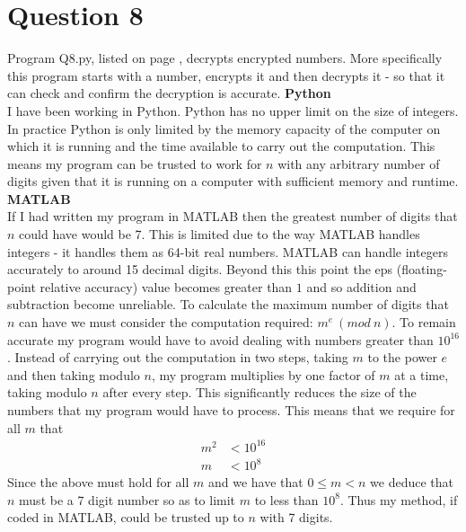 \documentclass[a4paper]{article}
\begin{document}
\section*{Question 8}
Program Q8.py, listed on page \pageref{PQ8}, decrypts encrypted numbers. More specifically this program starts with a number, encrypts it and then decrypts it - so that it can check and confirm the decryption is accurate.
\bigbreak
\textbf{Python} \\
I have been working in Python. Python has no upper limit on the size of integers. In practice Python is only limited by the memory capacity of the computer on which it is running and the time available to carry out the computation. This means my program can be trusted to work for $n$ with any arbitrary number of digits given that it is running on a computer with sufficient memory and runtime.
\bigbreak
\textbf{MATLAB} \\
If I had written my program in MATLAB then the greatest number of digits that $n$ could have would be 7. This is limited due to the way MATLAB handles integers - it handles them as 64-bit real numbers. MATLAB can handle integers accurately to around 15 decimal digits. Beyond this this point the eps (floating-point relative accuracy) value becomes greater than $1$ and so addition and subtraction become unreliable.
\bigbreak
To calculate the maximum number of digits that $n$ can have we must consider the computation required: $m^e \ (mod\ n)$. To remain accurate my program would have to avoid dealing with numbers greater than $10^{16}$. Instead of carrying out the computation in two steps, taking $m$ to the power $e$ and then taking modulo $n$, my program multiplies by one factor of $m$ at a time, taking modulo $n$ after every step. This significantly reduces the size of the numbers that my program would have to process. This means that we require for all $m$ that
\begin{align*}
m^2 &< 10^{16} \\
m &< 10^{8}
\end{align*}
Since the above must hold for all $m$ and we have that $0\leq m<n$ we deduce that $n$ must be a 7 digit number so as to limit $m$ to less than $10^8$. Thus my method, if coded in MATLAB, could be trusted up to $n$ with 7 digits.
\end{document}
